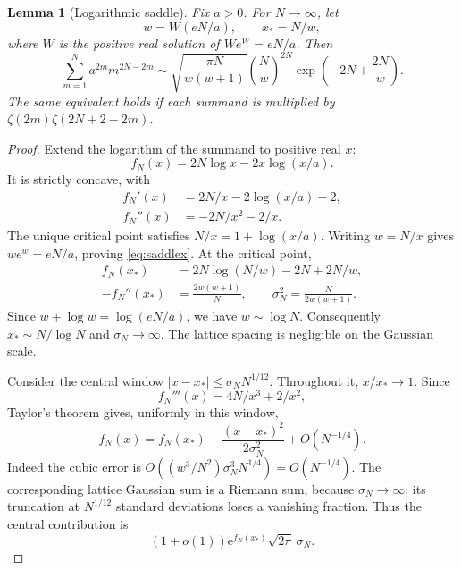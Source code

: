 \documentclass[11pt,a4paper]{article}
\numberwithin{equation}{section}
\newtheorem{lemma}[theorem]{Lemma}
\theoremstyle{definition}
\theoremstyle{remark}
\newcommand{\e}{\mathrm e}
\begin{document}
\begin{lemma}[Logarithmic saddle]
\label{lem:saddle}
Fix $a>0$. For $N\to\infty$, let
\begin{equation}
 w=W(eN/a),\qquad x_* = N/w,
 \label{eq:saddlex}
\end{equation}
where $W$ is the positive real solution of $We^W=eN/a$. Then
\begin{equation}
 \sum_{m=1}^{N}a^{2m}m^{2N-2m}
 \sim\sqrt{\frac{\pi N}{w(w+1)}}
       \left(\frac Nw\right)^{2N}
       \exp\!\left(-2N+\frac{2N}{w}\right).
 \label{eq:saddlelemma}
\end{equation}
The same equivalent holds if each summand is multiplied by
$\zeta(2m)\zeta(2N+2-2m)$.
\end{lemma}
\begin{proof}
Extend the logarithm of the summand to positive real $x$:
\begin{equation}
 f_N(x)=2N\log x-2x\log(x/a).
 \label{eq:fN}
\end{equation}
It is strictly concave, with
\begin{align*}
 f_N'(x)&=2N/x-2\log(x/a)-2,\\
 f_N''(x)&=-2N/x^2-2/x.
\end{align*}
The unique critical point satisfies $N/x=1+\log(x/a)$. Writing $w=N/x$ gives $we^w=eN/a$, proving \eqref{eq:saddlex}. At the critical point,
\begin{align}
 f_N(x_*)&=2N\log(N/w)-2N+2N/w,\label{eq:fstar}\\
 -f_N''(x_*)&=\frac{2w(w+1)}{N},\qquad
 \sigma_N^2=\frac{N}{2w(w+1)}.
 \label{eq:sigma}
\end{align}
Since $w+\log w=\log(eN/a)$, we have $w\sim\log N$.
Consequently $x_*\sim N/\log N$ and $\sigma_N\to\infty$. The lattice spacing is negligible on the Gaussian scale.

Consider the central window $|x-x_*|\le\sigma_N N^{1/12}$. Throughout it, $x/x_*\to1$. Since
\[
 f_N'''(x)=4N/x^3+2/x^2,
\]
Taylor's theorem gives, uniformly in this window,
\begin{equation}
 f_N(x)=f_N(x_*)-\frac{(x-x_*)^2}{2\sigma_N^2}+O(N^{-1/4}).
 \label{eq:centralTaylor}
\end{equation}
Indeed the cubic error is
$O((w^3/N^2)\sigma_N^3N^{1/4})=O(N^{-1/4})$.
The corresponding lattice Gaussian sum is a Riemann sum, because $\sigma_N\to\infty$; its truncation at $N^{1/12}$ standard deviations loses a vanishing fraction. Thus the central contribution is
\begin{equation}
 (1+o(1))\e^{f_N(x_*)}\sqrt{2\pi}\,\sigma_N.
 \label{eq:centralsum}
\end{equation}


\end{proof}
\end{document}
